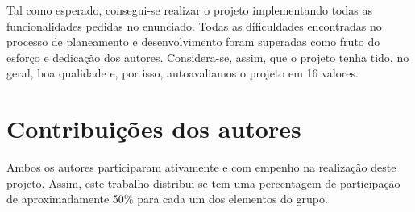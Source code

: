 \documentclass{report}
\begin{document}
Tal como esperado, consegui-se realizar o projeto implementando todas as funcionalidades pedidas no enunciado. Todas as dificuldades encontradas no processo de planeamento e desenvolvimento foram superadas como fruto do esforço e dedicação dos autores. Considera-se, assim, que o projeto tenha tido, no geral, boa qualidade e, por isso, autoavaliamos o projeto em 16 valores.


\section*{Contribuições dos autores}
\label{chap.contribuicoes}

Ambos os autores participaram ativamente e com empenho na realização deste projeto. Assim, este trabalho distribui-se tem uma percentagem de participação de aproximadamente 50\% para cada um dos elementos do grupo.
\end{document}
